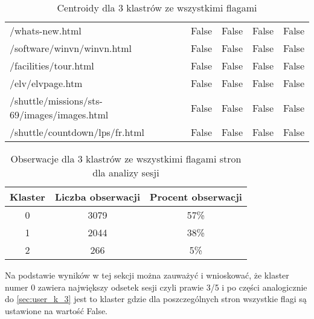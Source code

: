 \documentclass[../EDI_Task1_Karwowski_Kowalewski.tex]{subfiles}
\begin{document}
{{{\begin{table}[!htbp]
\begin{tabular}{|l|c|c|c|c|}
                    /whats-new.html                                  &      False   &   False   &   False   &   False \\
                    /software/winvn/winvn.html                       &      False   &   False   &   False   &   False \\
                    /facilities/tour.html                            &      False   &   False   &   False   &   False \\
                    /elv/elvpage.htm                                 &      False   &   False   &   False   &   False \\
                    /shuttle/missions/sts-69/images/images.html      &      False   &   False   &   False   &   False \\
                    /shuttle/countdown/lps/fr.html                   &      False   &   False   &   False   &   False \\ \hline
                \end{tabular}
                \caption
                {Centroidy dla 3 klastrów ze wszystkimi flagami}
                \label{sessions_flag_k_3}
            \end{table}

            \begin{table}[!htbp]
                \footnotesize
                \centering
                \begin{tabular}{|c|c|c|}
                    \hline
                    Klaster & Liczba obserwacji & Procent obserwacji \\ \hline
                    0   &   3079 & 57\% \\
                    1   &   2044 & 38\% \\
                    2   &    266 &  5\% \\ \hline
                \end{tabular}
                \caption
                {Obserwacje dla 3 klastrów ze wszystkimi flagami stron dla analizy sesji}
                \label{stats_session_flag_k_3}
            \end{table}
            \FloatBarrier

            Na podstawie wyników w tej sekcji można zauważyć i wnioskować, że
            klaster numer 0 zawiera największy odsetek sesji czyli prawie 3/5 i
            po części analogicznie do \ref{sec:user_k_3} jest to klaster gdzie dla
            poszczególnych stron wszystkie flagi są ustawione na wartość False.
        }

}}
\end{document}

